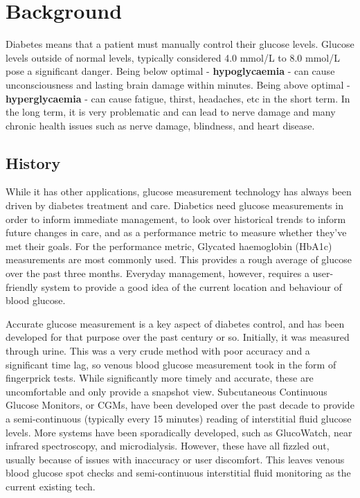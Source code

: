 \chapter{Background}

Diabetes means that a patient must manually control their glucose levels. Glucose levels outside of normal levels, typically considered 4.0 mmol/L to 8.0 mmol/L pose a significant danger. Being below optimal -  \textbf{hypoglycaemia} - can cause unconsciousness and lasting brain damage within minutes. Being above optimal - \textbf{hyperglycaemia} -  can cause fatigue, thirst, headaches, etc in the short term. In the long term, it is very problematic and can lead to nerve damage and many chronic health issues such as nerve damage, blindness, and heart disease. 

\section{History}

While it has other applications, glucose measurement technology has always been driven by diabetes treatment and care. Diabetics need glucose measurements in order to inform immediate management, to look over historical trends to inform future changes in care, and as a performance metric to measure whether they’ve met their goals. For the performance metric, Glycated haemoglobin (HbA1c) measurements are most commonly used. This provides a rough average of glucose over the past three months. Everyday management, however, requires a user-friendly system to provide a good idea of the current location and behaviour of blood glucose.

Accurate glucose measurement is a key aspect of diabetes control, and has been developed for that purpose over the past century or so. Initially, it was measured through urine. This was a very crude method with poor accuracy and a significant time lag, so venous blood glucose measurement took in the form of fingerprick tests. While significantly more timely and accurate, these are uncomfortable and only provide a snapshot view. Subcutaneous Continuous Glucose Monitors, or CGMs, have been developed over the past decade to provide a semi-continuous (typically every 15 minutes) reading of interstitial fluid glucose levels. More systems have been sporadically developed, such as GlucoWatch, near infrared spectroscopy, and microdialysis. However, these have all fizzled out, usually because of issues with inaccuracy or user discomfort. This leaves venous blood glucose spot checks and semi-continuous interstitial fluid monitoring as the current existing tech. 

